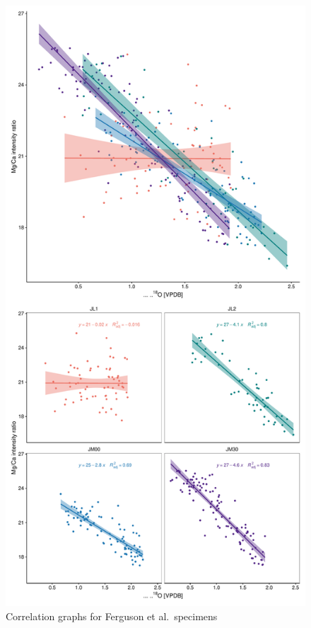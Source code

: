 \documentclass[
  authoryear,
  preprint,
  3p]{elsarticle}
\begin{document}
\begin{figure}[H]

{\centering \includegraphics{Manuscript_files/figure-pdf/Ferguson Data-1.pdf}

}

\caption{Correlation graphs for Ferguson et al.~specimens}

\end{figure}%
\end{document}
